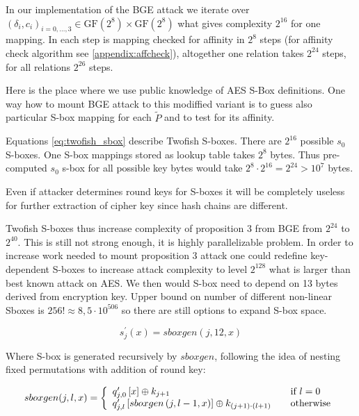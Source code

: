 \documentclass[11pt,oneside,final]{fithesis2}
\begin{document}
    In our implementation of the BGE attack we iterate over $\left(\delta_i, c_i\right)_{i=0,\dots,3} \in \text{GF}(2^8)\times\text{GF}(2^8)$ what gives complexity $2^{16}$ for one mapping.
    In each step is mapping checked for affinity in $2^8$ steps (for affinity check algorithm see \ref{appendix:affcheck}), altogether one relation takes $2^{24}$ steps, for all relations
    $2^{26}$ steps.
    
    Here is the place where we use public knowledge of AES S-Box definitions. One way how to mount BGE attack to this modiffied variant is to guess also particular S-box
    mapping for each $\widetilde{P}$ and to test for its affinity. 
    
    Equations \ref{eq:twofish_sbox} describe Twofish S-boxes. There are $2^{16}$ possible $s_0$ S-boxes. One S-box mappings stored as lookup table takes $2^8$ bytes.
    Thus pre-computed $s_0$ s-box for all possible key bytes would take $2^8 \cdot 2^{16} = 2^{24} > 10^7$ bytes. 
    
    Even if attacker determines round keys for S-boxes it will be completely useless for further extraction of cipher key since hash chains are different. 
    
    Twofish S-boxes thus increase complexity of proposition 3 from BGE from $2^{24}$ to $2^{40}$. This is still not strong enough, it is highly parallelizable problem.
    In order to increase work needed to mount proposition 3 attack one could redefine key-dependent S-boxes to increase attack complexity to level $2^{128}$ what is larger
    than best known attack on AES. We then would S-box need to depend on 13 bytes derived from encryption key. Upper bound on number of different non-linear Sboxes is $256! \approx 8,5\cdot 10^{506}$ so there are still options to expand 
    S-box space. 
    
    \begin{equation}\label{eq:complex_sbox}
	s^{\prime}_{j}\left(x\right) = sboxgen(j,12,x)
    \end{equation}
    
    Where S-box is generated recursively by $sboxgen$, following the idea of nesting fixed permutations with addition of round key:
    
    \begin{equation}\label{eq:sboxgen}
	sboxgen(j,l,x) = \left\{ 
	\begin{array}{l l}  
	    q^{\prime}_{j,0}\left[ x \right]                          \oplus k_{j+1}		            & \quad \text{if $l=0$}\\
	    q^{\prime}_{j,l}\left[sboxgen\left(j, l-1,x\right)\right] \oplus k_{(j+1) \cdot (l+1)}          & \quad \text{otherwise}
	\end{array} \right.
    \end{equation}
    
\end{document}
